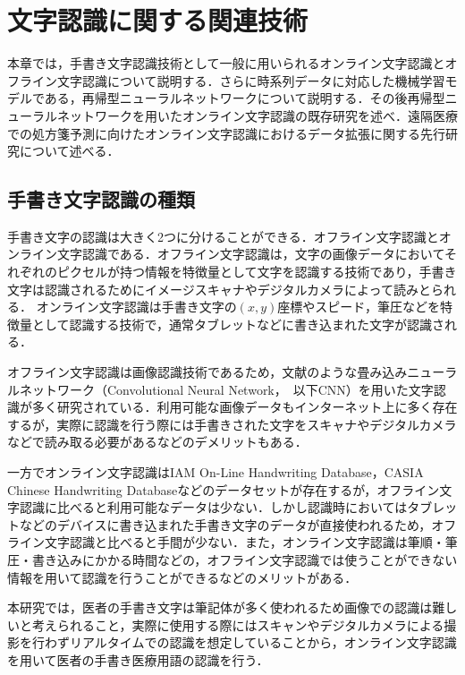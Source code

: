
\chapter{文字認識に関する関連技術}
\label{cha:relate}
本章では，手書き文字認識技術として一般に用いられるオンライン文字認識とオフライン文字認識について説明する．さらに時系列データに対応した機械学習モデルである，再帰型ニューラルネットワークについて説明する．その後再帰型ニューラルネットワークを用いたオンライン文字認識の既存研究を述べ．遠隔医療での処方箋予測に向けたオンライン文字認識におけるデータ拡張に関する先行研究について述べる．

\section{手書き文字認識の種類}
\label{sec:rel_1}
手書き文字の認識は大きく2つに分けることができる．オフライン文字認識とオンライン文字認識である．オフライン文字認識は，文字の画像データにおいてそれぞれのピクセルが持つ情報を特徴量として文字を認識する技術であり，手書き文字は認識されるためにイメージスキャナやデジタルカメラによって読みとられる．
オンライン文字認識は手書き文字の$(x, y)$座標やスピード，筆圧などを特徴量として認識する技術で，通常タブレットなどに書き込まれた文字が認識される．

オフライン文字認識は画像認識技術であるため，文献\cite{yuan12:offline}のような畳み込みニューラルネットワーク（Convolutional Neural Network，　以下CNN）を用いた文字認識が多く研究されている．利用可能な画像データもインターネット上に多く存在するが，実際に認識を行う際には手書きされた文字をスキャナやデジタルカメラなどで読み取る必要があるなどのデメリットもある．

一方でオンライン文字認識はIAM On-Line Handwriting Database\cite{iam}，CASIA Chinese Handwriting Database\cite{liu11:casia}などのデータセットが存在するが，オフライン文字認識に比べると利用可能なデータは少ない．しかし認識時においてはタブレットなどのデバイスに書き込まれた手書き文字のデータが直接使われるため，オフライン文字認識と比べると手間が少ない．また，オンライン文字認識は筆順・筆圧・書き込みにかかる時間などの，オフライン文字認識では使うことができない情報を用いて認識を行うことができるなどのメリットがある．

本研究では，医者の手書き文字は筆記体が多く使われるため画像での認識は難しいと考えられること，実際に使用する際にはスキャンやデジタルカメラによる撮影を行わずリアルタイムでの認識を想定していることから，オンライン文字認識を用いて医者の手書き医療用語の認識を行う．

